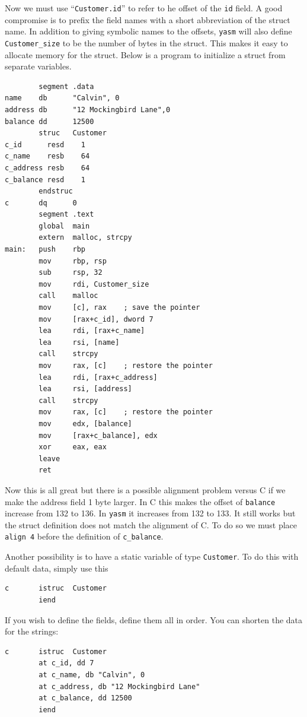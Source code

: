 \documentclass[11pt,b5paper]{book}
\begin{document}
Now we must use ``{\tt Customer.id}'' to refer to he offset of the {\tt id} field.
A good compromise is to prefix the field names with a short abbreviation of the struct name.
In addition to giving symbolic names to the offsets, {\tt yasm} will also define {\tt Customer\_size}
to be the number of bytes in the struct.
This makes it easy to allocate memory for the struct.
Below is a program to initialize a struct from separate variables.
\begin{verbatim}
        segment .data
name    db      "Calvin", 0
address db      "12 Mockingbird Lane",0
balance dd      12500
        struc   Customer
c_id      resd    1
c_name    resb    64
c_address resb    64
c_balance resd    1
        endstruc
c       dq      0
        segment .text
        global  main
        extern  malloc, strcpy
main:   push    rbp
        mov     rbp, rsp
        sub     rsp, 32
        mov     rdi, Customer_size
        call    malloc
        mov     [c], rax    ; save the pointer
        mov     [rax+c_id], dword 7
        lea     rdi, [rax+c_name]
        lea     rsi, [name]
        call    strcpy
        mov     rax, [c]    ; restore the pointer
        lea     rdi, [rax+c_address]
        lea     rsi, [address]
        call    strcpy
        mov     rax, [c]    ; restore the pointer
        mov     edx, [balance]
        mov     [rax+c_balance], edx
        xor     eax, eax
        leave
        ret
\end{verbatim}

Now this is all great but there is a possible alignment problem versus C if we make the address field 1 byte larger.
In C this makes the offset of {\tt balance} increase from 132 to 136.
In {\tt yasm} it increases from 132 to 133.
It still works but the struct definition does not match the alignment of C.
To do so we must place {\tt align 4} before the definition of {\tt c\_balance}.

Another possibility is to have a static variable of type {\tt Customer}.
To do this with default data, simply use this
\begin{verbatim}
c       istruc  Customer
        iend
\end{verbatim}
If you wish to define the fields, define them all in order.
You can shorten the data for the strings:
\begin{verbatim}
c       istruc  Customer
        at c_id, dd 7
        at c_name, db "Calvin", 0
        at c_address, db "12 Mockingbird Lane"
        at c_balance, dd 12500
        iend
\end{verbatim}
\end{document}
